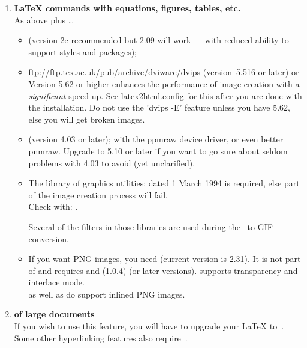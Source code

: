 \begin{enumerate}
%
%
%
\item 
\textbf{\LaTeX{}  commands with equations, figures, tables, etc.} \\
As above plus \dots
%
\begin{itemize}
\item {} (version 2e recommended but 2.09 will work --- with
reduced ability to support styles and packages);
%
\item 
{}
{ftp://ftp.tex.ac.uk/pub/archive/dviware/dvips}
(version~5.516 or later) or \\
  Version 5.62 or higher enhances the performance of image creation
  with a \emph{significant} speed-up. See latex2html.config for this
  after you are done with the installation.
  Do not use the 'dvips -E' feature unless you have 5.62, else you
  will get broken images.
%
\item 
{}  (version 4.03 or later);
  with the ppmraw device driver, or even better pnmraw.
  Upgrade to 5.10 or later if you want to go sure about seldom problems
  with 4.03 to avoid (yet unclarified).
%
%
%
\item 
The 
library of graphics utilities;  dated 1 March 1994
is required, else part of the image creation process will fail.\\
Check with:  .

Several of the filters in those libraries are used during the \PS\ to
GIF conversion. 
%
%
\item 
If you want PNG images, you need  (current version is 2.31).
It is not part of  and requires  and
 (1.0.4) (or later versions).
 supports transparency and interlace mode.\\
 as well as  do support inlined
PNG images.
\end{itemize}


%
%
\item 
\textbf{ of large documents}\\
If you wish to use this feature, you will have to upgrade your
\LaTeX{} to \LaTeXe\,. 
Some other hyperlinking features also require \LaTeXe\,.


\end{enumerate}
